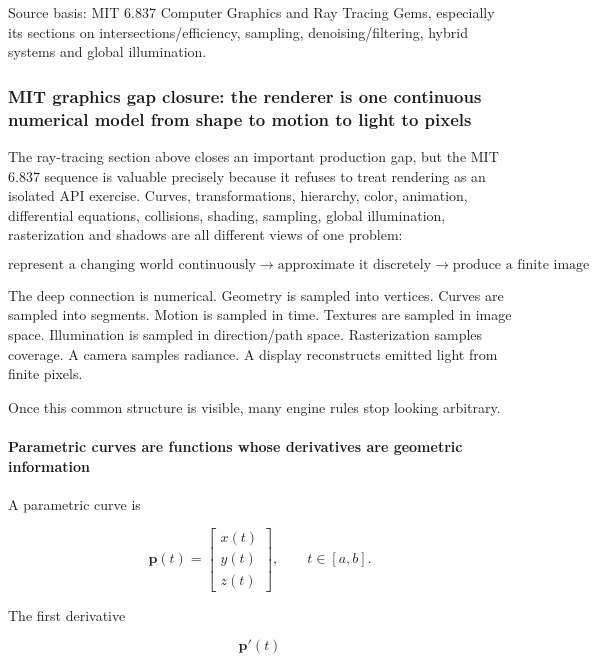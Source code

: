 Source basis: MIT 6.837 Computer Graphics and Ray Tracing Gems, especially its sections on intersections/efficiency, sampling, denoising/filtering, hybrid systems and global illumination.

\subsubsection{MIT graphics gap closure: the renderer is one continuous numerical model from shape to motion to light to pixels}\label{mit-graphics-gap-closure-the-renderer-is-one-continuous-numerical-model-from-shape-to-motion-to-light-to-pixels}

The ray-tracing section above closes an important production gap, but the MIT 6.837 sequence is valuable precisely because it refuses to treat rendering as an isolated API exercise. Curves, transformations, hierarchy, color, animation, differential equations, collisions, shading, sampling, global illumination, rasterization and shadows are all different views of one problem:

\[
\boxed{
\text{represent a changing world continuously}
\rightarrow
\text{approximate it discretely}
\rightarrow
\text{produce a finite image}
}
\]

The deep connection is numerical. Geometry is sampled into vertices. Curves are sampled into segments. Motion is sampled in time. Textures are sampled in image space. Illumination is sampled in direction/path space. Rasterization samples coverage. A camera samples radiance. A display reconstructs emitted light from finite pixels.

Once this common structure is visible, many engine rules stop looking arbitrary.

\paragraph{Parametric curves are functions whose derivatives are geometric information}\label{parametric-curves-are-functions-whose-derivatives-are-geometric-information}

A parametric curve is

\[
\mathbf p(t)=
\begin{bmatrix}
x(t)\\
y(t)\\
z(t)
\end{bmatrix},
\qquad
t\in[a,b].
\]

The first derivative

\[
\mathbf p'(t)
\]

